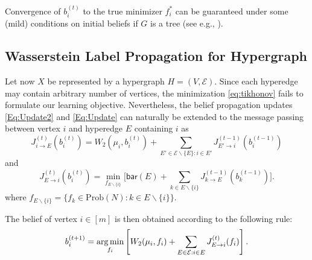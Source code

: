 \documentclass[letterpaper]{article} %
\begin{document}
Convergence of $b_i^{(t)}$ to the true minimizer $f^*_i$ can be guaranteed under some (mild) conditions on initial beliefs if $G$ is a tree (see e.g., \cite{min_Sum}). 
\subsection{Wasserstein Label Propagation for Hypergraph}
Let now $X$ be represented by a hypergraph $H=(V, \mathcal E)$. Since each hyperedge may contain arbitrary number of vertices, the minimization \eqref{eq:tikhonov} fails to formulate our learning objective. Nevertheless, the belief propagation updates \eqref{Eq:Update2} and \eqref{Eq:Update} can naturally be extended to the message passing between vertex $i$ and hyperedge $E$ containing $i$ as 
\begin{equation}\label{Eq:Update_H_2}
J^{(t)}_{i\to E} (b_i^{(t)}) = W_2(\mu_i, b_i^{(t)}) + \sum_{E'\in \mathcal E\backslash\{E\}: i\in E'}J^{(t-1)}_{E'\to i}(b_i^{(t-1)})
\end{equation}
and 
\begin{equation}\label{Eq:Update_H}
    J^{(t)}_{E\to i}(b_i^{(t)}) =  \min_{f_{E\backslash \{i\}}}\Big[\mathsf{bar}(E) + \sum_{k\in E\backslash \{i\}}J^{(t-1)}_{k\to E}(b_k^{(t-1)})\Big].
\end{equation}
where  $f_{E\backslash \{i\}}=\{f_k\in\mathrm{Prob}(N): k\in E\backslash\{i\}\}$.

The belief of vertex $i\in [m]$ is then obtained according to the following rule:
$$b_i^{(t+1)}=\mathop{\rm arg\, min}_{f_i}\left[W_2(\mu_i, f_i) + \sum_{E\in \mathcal{E}:i\in E}J^{(t)}_{E\to i}(f_i)\right].$$
\end{document}
